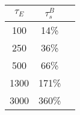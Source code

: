 \begin{tabular}{ccc}
\toprule
$\tau_E$ & $\tau_s^B$ \\
\midrule
100 & 14\% \\
250 & 36\% \\
500 & 66\% \\
1300 & 171\% \\
3000 & 360\% \\
\bottomrule
\end{tabular}
